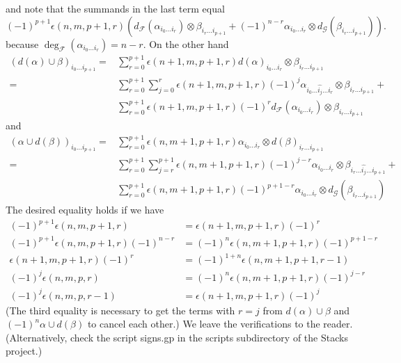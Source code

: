 and note that the summands in the last term equal
$$
(-1)^{p + 1} \epsilon(n, m, p + 1, r)
\left(
d_{\mathcal F}(\alpha_{i_0 \ldots i_r}) \otimes 
\beta_{i_r \ldots i_{p + 1}} +
(-1)^{n - r}
\alpha_{i_0 \ldots i_r} \otimes d_{\mathcal G}(\beta_{i_r \ldots i_{p + 1}})
\right).
$$
because $\deg_\mathcal{F}(\alpha_{i_0 \ldots i_r}) = n - r$.
On the other hand
\begin{align*}
(d(\alpha) \cup \beta)_{i_0\ldots i_{p + 1}}
= &
\sum\nolimits_{r = 0}^{p + 1}
\epsilon(n + 1, m, p + 1, r)
d(\alpha)_{i_0\ldots i_r} \otimes \beta_{i_r\ldots i_{p + 1}}
\\
= &
\sum\nolimits_{r = 0}^{p + 1}
\sum\nolimits_{j = 0}^{r}
\epsilon(n + 1, m, p + 1, r) (-1)^j
\alpha_{i_0\ldots\hat{i_j}\ldots i_r} \otimes \beta_{i_r\ldots i_{p + 1}}
+ \\
&
\sum\nolimits_{r = 0}^{p + 1}
\epsilon(n + 1, m, p + 1, r) (-1)^r
d_{\mathcal F}(\alpha_{i_0 \ldots i_r}) \otimes \beta_{i_r\ldots i_{p + 1}}
\end{align*}
and
\begin{align*}
(\alpha \cup d(\beta))_{i_0\ldots i_{p + 1}}
= &
\sum\nolimits_{r = 0}^{p + 1}
\epsilon(n, m + 1, p + 1, r)
\alpha_{i_0 \ldots i_r} \otimes d(\beta)_{i_r \ldots i_{p + 1}}
\\
= &
\sum\nolimits_{r = 0}^{p + 1}
\sum\nolimits_{j = r}^{p + 1}
\epsilon(n, m + 1, p + 1, r) (-1)^{j - r}
\alpha_{i_0 \ldots i_r} \otimes \beta_{i_r \ldots \hat{i_j}\ldots i_{p + 1}}
+ \\
&
\sum\nolimits_{r = 0}^{p + 1}
\epsilon(n, m + 1, p + 1, r) (-1)^{p + 1 - r}
\alpha_{i_0 \ldots i_r} \otimes d_{\mathcal G}(\beta_{i_r \ldots i_{p + 1}})
\end{align*}
The desired equality holds if we have
\begin{align*}
(-1)^{p + 1} \epsilon(n, m, p + 1, r)
& =
\epsilon(n + 1, m, p + 1, r) (-1)^r \\
(-1)^{p + 1} \epsilon(n, m, p + 1, r) (-1)^{n - r}
& =
(-1)^n \epsilon(n, m + 1, p + 1, r) (-1)^{p + 1 - r} \\
\epsilon(n + 1, m, p + 1, r) (-1)^r
& =
(-1)^{1 + n} \epsilon(n, m + 1, p + 1, r - 1) \\
(-1)^j \epsilon(n, m, p, r)
& =
(-1)^n \epsilon(n, m + 1, p + 1, r) (-1)^{j - r} \\
(-1)^j \epsilon(n, m, p, r - 1)
& =
\epsilon(n + 1, m, p + 1, r) (-1)^j
\end{align*}
(The third equality is necessary to get the terms with $r = j$
from $d(\alpha) \cup \beta$ and $(-1)^n \alpha \cup d(\beta)$
to cancel each other.) We leave the verifications to the reader.
(Alternatively, check the script signs.gp in the scripts subdirectory
of the Stacks project.)

